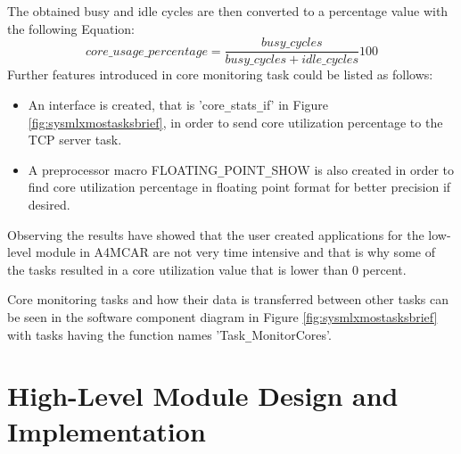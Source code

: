 

The obtained busy and idle cycles are then converted to a percentage value with the following Equation:
\begin{equation}
core\texttt{\_}usage\texttt{\_}percentage=\frac{busy\texttt{\_}cycles}{busy\texttt{\_}cycles + idle\texttt{\_}cycles} 100
\end{equation}
Further features introduced in core monitoring task could be listed as follows:
\begin{itemize}
	\item An interface is created, that is 'core\texttt{\_}stats\texttt{\_}if' in Figure \ref{fig:sysmlxmostasksbrief}, in order to send core utilization percentage to the TCP server task. 
	\item A preprocessor macro FLOATING\texttt{\_}POINT\texttt{\_}SHOW is also created in order to find core utilization percentage in floating point format for better precision if desired.
\end{itemize}

Observing the results have showed that the user created applications for the low-level module in A4MCAR are not very time intensive and that is why some of the tasks resulted in a core utilization value that is lower than 0 percent.

Core monitoring tasks and how their data is transferred between other tasks can be seen in the software component diagram in Figure \ref{fig:sysmlxmostasksbrief} with tasks having the function names 'Task\texttt{\_}MonitorCores'.

\section{High-Level Module Design and Implementation}
